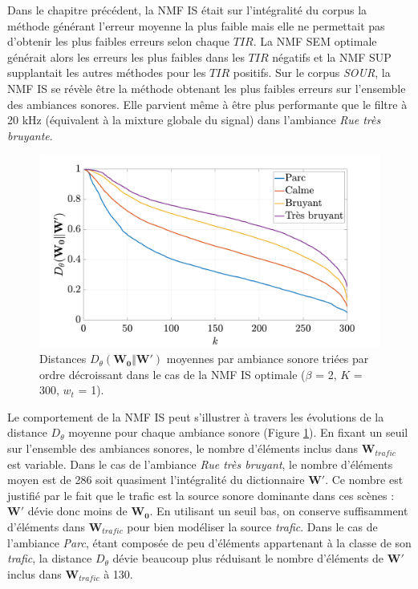 Dans le chapitre précédent, la NMF IS était sur l'intégralité du corpus la méthode générant l'erreur moyenne la plus faible mais elle ne permettait pas d'obtenir les plus faibles erreurs selon chaque $TIR$. La NMF SEM optimale générait alors les erreurs les plus faibles dans les $TIR$ négatifs et la NMF SUP supplantait les autres méthodes pour les $TIR$ positifs. 
Sur le corpus \textit{SOUR}, la NMF IS se révèle être la méthode obtenant les plus faibles erreurs sur l'ensemble des ambiances sonores. Elle parvient même à être plus performante que le filtre à 20 kHz (équivalent à la mixture globale du signal) dans l'ambiance \textit{Rue très bruyante}. 

\begin{figure}[h]
\centering
\includegraphics[width=.7\linewidth]{./figures/resultats/dist_grafic.pdf}
\caption{Distances $D_{\theta}(\mathbf{W_0}\Vert \mathbf{W'})$ moyennes par ambiance sonore triées par ordre décroissant  dans le cas de la NMF IS optimale ($\beta$ = 2, $K$ = 300, $w_t$ = 1).}
\label{fig:dist_grafic}
\end{figure}

Le comportement de la NMF IS peut s'illustrer à travers les évolutions de la distance $D_{\theta}$ moyenne pour chaque ambiance sonore (Figure \ref{fig:dist_grafic}).
En fixant un seuil sur l'ensemble des ambiances sonores, le nombre d'éléments inclus dans $\mathbf{W}_{trafic}$ est variable. 
Dans le cas de l'ambiance \textit{Rue très bruyant}, le nombre d'éléments moyen est de 286 soit quasiment l'intégralité du dictionnaire $\mathbf{W'}$. Ce nombre est justifié par le fait que le trafic est la source sonore dominante dans ces scènes : $\mathbf{W'}$ dévie donc moins de $\mathbf{W_0}$. En utilisant un seuil bas, on conserve suffisamment d'éléments dans $\mathbf{W}_{trafic}$ pour bien modéliser la source \textit{trafic}.
Dans le cas de l'ambiance \textit{Parc}, étant composée de peu d'éléments appartenant à la classe de son \textit{trafic}, la distance $D_{\theta}$ dévie beaucoup plus réduisant le nombre d'éléments de $\mathbf{W'}$ inclus dans $\mathbf{W}_{trafic}$ à 130.

